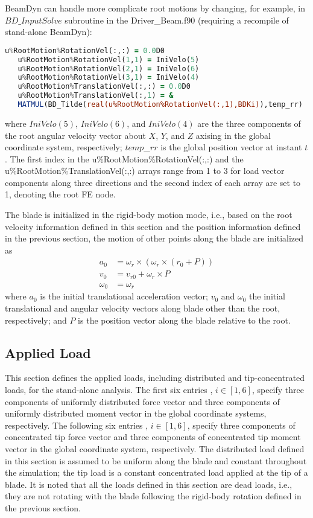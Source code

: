 BeamDyn can handle more complicate root motions by changing, for example, in $BD\_InputSolve$ subroutine in the Driver\_Beam.f90  (requiring a recompile of stand-alone BeamDyn):
\begin{lstlisting}[frame=single,language=Fortran]
   u%RootMotion%RotationVel(:,:) = 0.0D0
   u%RootMotion%RotationVel(1,1) = IniVelo(5)
   u%RootMotion%RotationVel(2,1) = IniVelo(6)
   u%RootMotion%RotationVel(3,1) = IniVelo(4)
   u%RootMotion%TranslationVel(:,:) = 0.0D0
   u%RootMotion%TranslationVel(:,1) = &
   MATMUL(BD_Tilde(real(u%RootMotion%RotationVel(:,1),BDKi)),temp_rr)
\end{lstlisting}
where $IniVelo(5)$, $IniVelo(6)$, and $IniVelo(4)$ are the three components of the root angular velocity vector about  $X$, $Y$, and $Z$ axising in the global coordinate system, respectively; $temp$\_$rr$ is the global position vector at instant $t$. The first index in the u\%RootMotion\%RotationVel(:,:) and the u\%RootMotion\%TranslationVel(:,:) arrays range from 1 to 3 for load vector components along three directions and the second index of each array are set to 1, denoting the root FE node. 


The blade is initialized in the rigid-body motion mode, i.e., based on the root velocity information defined in this section and the position information defined in the previous section, the motion of other points along the blade are initialized as
\begin{align}
    \label{IniRootAcc}
    a_{0} &= \omega_r \times (\omega_r \times (r_0 + P)) \\
    \label{IniTraVel}
    v_0 &= v_{r0} + \omega_r \times P \\
    \label{IniAngVel}
    \omega_0 &= \omega_r
\end{align}
where $a_{0}$ is the initial translational acceleration vector; $v_0$ and $\omega_0$ the initial translational and angular velocity vectors along blade other than the root, respectively; and $P$ is the position vector along the blade relative to the root. 

\subsection{Applied Load}
This section defines the applied loads, including distributed and tip-concentrated loads, for the stand-alone analysis. 
The first six entries , $i \in [1,6]$, specify three components of uniformly distributed force vector and three components of uniformly distributed moment vector in the global coordinate systems, respectively. 
The following six entries , $i \in [1,6]$, specify three components of concentrated tip force vector and three components of concentrated tip moment vector in the global coordinate system, respectively. 
The distributed load defined in this section is assumed to be uniform along the blade and constant throughout the simulation; the tip load is a constant concentrated load applied at the tip of a blade. It is noted that all the loads defined in this section are dead loads, i.e., they are not rotating with the blade following the rigid-body rotation defined in the previous section. 

